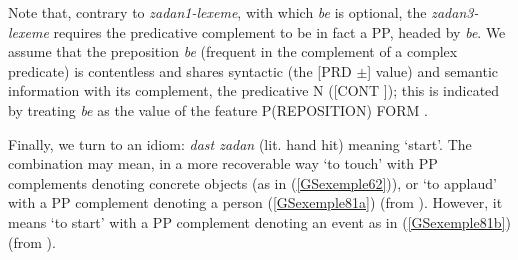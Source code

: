 \documentclass[output=paper
	        ,collection
	        ,collectionchapter
 	        ,biblatex
                ,babelshorthands
                ,newtxmath
                ,draftmode
                ,colorlinks, citecolor=brown
]{langscibook}
\begin{document}
{\begin{exe}
\end{exe}

Note that, contrary to \emph{zadan1-lexeme}, with which \emph{be} is optional, the \emph{zadan3-lexeme} requires the predicative complement to be in fact a PP, headed by \emph{be}. We assume that the preposition \emph{be} (frequent in the complement of a complex predicate) is contentless and shares syntactic (the [PRD $\pm$] value) and semantic information with its complement, the predicative N ([CONT ]); this is indicated by treating \emph{be} as the value of the feature P(REPOSITION) FORM \citep[Chapter~3]{ps}.  

Finally, we turn to an idiom: \emph{dast zadan} (lit. hand hit) meaning `start'. The combination may mean, in a more recoverable way `to touch' with PP complements denoting concrete objects (as in (\ref{GSexemple62})), or `to applaud' with a PP complement denoting a person (\ref{GSexemple81a}) (from \citealt[45]{pollet2012grammaire}). However, it means `to start' with a PP complement denoting an event as in (\ref{GSexemple81b}) (from \citealt[185]{pollet2012grammaire}).

\eal
	\label{GSexemple81} 
	\label{GSexemple81a}
		
}
\end{document}

